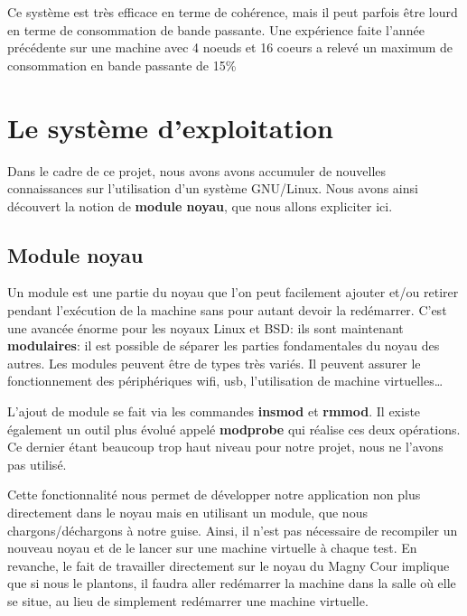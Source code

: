         Ce système est très efficace en terme de cohérence, mais il peut parfois
        être lourd en terme de consommation de bande passante. Une expérience
        faite l'année précédente sur une machine avec 4 noeuds et 16 coeurs a
        relevé un maximum de consommation en bande passante de
        15\%\cite{Lepers2014}

  \section{Le système d'exploitation}

    Dans le cadre de ce projet, nous avons avons accumuler de nouvelles
    connaissances sur l'utilisation d'un système GNU/Linux. Nous avons ainsi
    découvert la notion de \textbf{module noyau}, que nous allons expliciter
    ici.

    \subsection{Module noyau}

      Un module est une partie du noyau que l'on peut facilement ajouter et/ou
      retirer pendant l'exécution de la machine sans pour autant devoir la
      redémarrer. C'est une avancée énorme pour les noyaux Linux et BSD: ils
      sont maintenant \textbf{modulaires}: il est possible de séparer les
      parties fondamentales du noyau des autres. Les modules peuvent être de
      types très variés. Il peuvent assurer le fonctionnement des périphériques
      wifi, usb, l'utilisation de machine virtuelles\ldots \newline

      L'ajout de module se fait via les commandes \textbf{insmod} et
      \textbf{rmmod}. Il existe également un outil plus évolué appelé
      \textbf{modprobe} qui réalise ces deux opérations. Ce dernier étant
      beaucoup trop haut niveau pour notre projet, nous ne l'avons pas
      utilisé.\newline

      Cette fonctionnalité nous permet de développer notre application non plus
      directement dans le noyau mais en utilisant un module, que nous
      chargons/déchargons à notre guise. Ainsi, il n'est pas nécessaire de
      recompiler un nouveau noyau et de le lancer sur une machine virtuelle à
      chaque test. En revanche, le fait de travailler directement sur le
      noyau du Magny Cour implique que si nous le \og plantons\fg, il faudra
      aller redémarrer la machine dans la salle où elle se situe, au lieu de
      simplement redémarrer une machine virtuelle.

